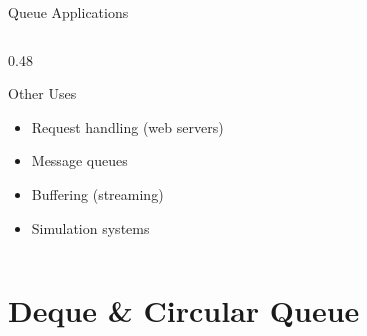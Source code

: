 \documentclass[aspectratio=169,xcolor=dvipsnames]{beamer}
\begin{document}
\begin{frame}[fragile]{Queue Applications}
\begin{columns}
\begin{column}{0.48\textwidth}
      \begin{block}{Other Uses}
        \begin{itemize}
          \item Request handling (web servers)
          \item Message queues
          \item Buffering (streaming)
          \item Simulation systems
        \end{itemize}
      \end{block}
    \end{column}
  \end{columns}
\end{frame}

\section{Deque \& Circular Queue}
\end{document}
